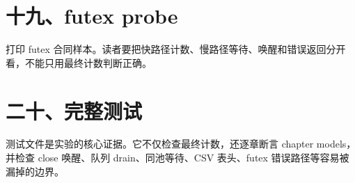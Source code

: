 

\section{十九、futex probe}

 打印 futex 合同样本。读者要把快路径计数、慢路径等待、唤醒和错误返回分开看，不能只用最终计数判断正确。



\section{二十、完整测试}

测试文件是实验的核心证据。它不仅检查最终计数，还逐章断言 chapter models，并检查 close 唤醒、队列 drain、同池等待、CSV 表头、futex 错误路径等容易被漏掉的边界。


